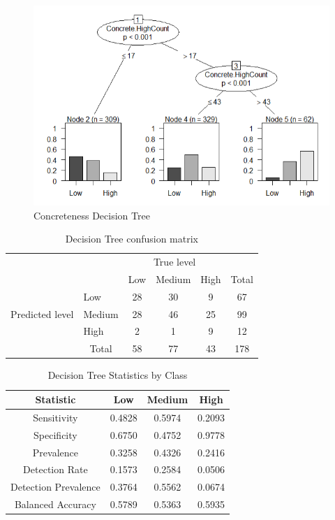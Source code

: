 \documentclass[12pt, a4paper]{article}
\begin{document}
\begin{figure}[ht]
\centerline{\includegraphics[scale=0.8]{decision_tree.png}}
\caption{Concreteness Decision Tree}
\label{decision_tree}
\end{figure}

\begin{table}[ht]
\centering
\begin{tabular}{l|l|c|c|c|c}
\multicolumn{2}{c}{}&\multicolumn{3}{c}{True level}&\\
\cline{3-5}
\multicolumn{2}{c|}{}&Low&Medium&High&\multicolumn{1}{c}{Total}\\
\cline{2-5}
\multirow{3}{*}{Predicted level}& Low & 28 & 30 & 9 & 67\\
\cline{2-5}
& Medium & 28 & 46 & 25 & 99\\
\cline{2-5}
& High & 2 & 1 & 9 & 12\\
\cline{2-5}
\multicolumn{1}{c}{} & \multicolumn{1}{c}{Total} & \multicolumn{1}{c}{58} & \multicolumn{    1}{c}{77} & \multicolumn{    1}{c}{43} & \multicolumn{1}{c}{178}\\
\end{tabular}
\caption{Decision Tree confusion matrix}
\label{table:decision_tree}
\end{table}

\begin{table}[ht]
\centering
\begin{tabular}{||c c c c||} 
 \hline
 Statistic & Low & Medium & High \\ [0.5ex] 
 \hline\hline
 Sensitivity & 0.4828 & 0.5974 & 0.2093 \\ 
 Specificity & 0.6750 & 0.4752 & 0.9778 \\
 Prevalence & 0.3258 & 0.4326 & 0.2416 \\
 Detection Rate & 0.1573 & 0.2584 & 0.0506 \\
 Detection Prevalence  & 0.3764 & 0.5562 & 0.0674 \\ 
 Balanced Accuracy  & 0.5789 & 0.5363 & 0.5935 \\ [1ex] 
 \hline

\end{tabular}
\caption{Decision Tree Statistics by Class}
\label{table:decisiontreestats}
\end{table}
\end{document}
